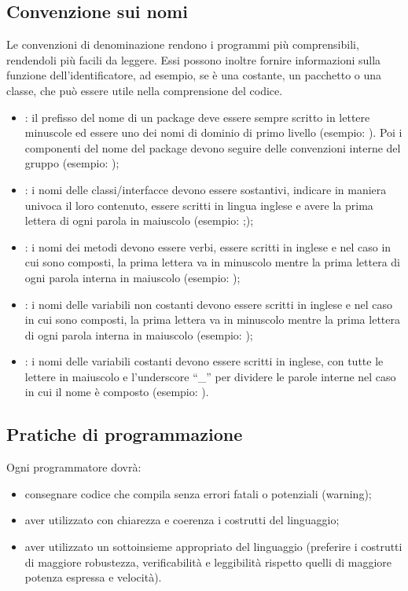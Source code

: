 \subsection{Convenzione sui nomi}
Le convenzioni di denominazione rendono i programmi pi\`u comprensibili,
rendendoli pi\`u facili da leggere. Essi possono inoltre fornire informazioni
sulla funzione dell'identificatore, ad esempio, se \`e una costante, un
pacchetto o una classe, che pu\`o essere utile nella comprensione del codice.
\begin{itemize}
  \item {}: il prefisso del nome di un package deve essere sempre
  scritto in lettere minuscole ed essere uno dei nomi di dominio di primo
  livello (esempio: ).
  Poi i componenti del nome del package devono seguire delle
  convenzioni interne del gruppo (esempio: );
  \item {}: i nomi delle classi/interfacce devono essere
  sostantivi, indicare in maniera univoca il loro contenuto, essere scritti in
  lingua inglese e avere la prima lettera di ogni parola in maiuscolo (esempio:
  ;);
  \item {}: i nomi dei metodi devono essere verbi, essere scritti in
  inglese e nel caso in cui sono composti, la prima lettera va in
  minuscolo mentre la prima lettera di ogni parola interna in maiuscolo
  (esempio: );
  \item {}: i nomi delle variabili non costanti devono essere scritti in
  inglese e nel caso in cui sono composti, la prima lettera va in
  minuscolo mentre la prima lettera di ogni parola interna in maiuscolo (esempio:
  );
  \item {}: i nomi delle variabili costanti devono essere
  scritti in inglese, con tutte le lettere in maiuscolo e l'underscore ``\_''
  per dividere le parole interne nel caso in cui il nome \`e composto (esempio:
  ).
\end{itemize}

\subsection{Pratiche di programmazione}
Ogni programmatore dovr\`a:
\begin{itemize}
  \item{consegnare codice che compila senza errori fatali o
potenziali (warning);} 
  \item{aver utilizzato con chiarezza e coerenza i costrutti del
linguaggio;}
  \item{aver utilizzato un sottoinsieme appropriato del linguaggio
(preferire i costrutti di maggiore robustezza, verificabilit\`a e leggibilit\`a
rispetto quelli di maggiore potenza espressa e velocit\`a).}
\end{itemize}


